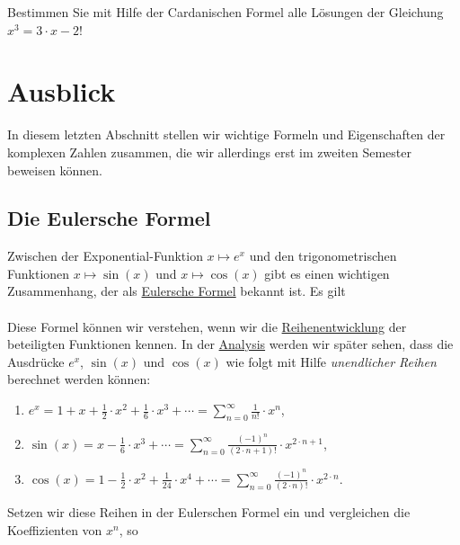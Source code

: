 \exercise
Bestimmen Sie mit Hilfe der Cardanischen Formel alle L\"{o}sungen der Gleichung 
\\[0.2cm]
\hspace*{1.3cm}
$x^3 = 3 \cdot x - 2$!
\exend


\section{Ausblick}
In diesem letzten Abschnitt stellen wir wichtige Formeln und Eigenschaften der komplexen Zahlen
zusammen, die wir allerdings erst im zweiten Semester beweisen k\"{o}nnen.

\subsection{Die Eulersche Formel}
Zwischen der Exponential-Funktion $x \mapsto e^x$ und den trigonometrischen Funktionen 
$x \mapsto \sin(x)$ und $x \mapsto \cos(x)$ gibt es einen wichtigen Zusammenhang, der als
{\href{https://de.wikipedia.org/wiki/Eulersche_Formel}{Eulersche Formel}} bekannt ist.  Es gilt
\\[0.2cm]
\hspace*{1.3cm}
\colorbox{red}{}
\\[0.2cm]
Diese Formel k\"{o}nnen wir verstehen, wenn wir die
\href{https://de.wikipedia.org/wiki/Taylorreihe}{Reihenentwicklung} der beteiligten Funktionen
kennen.  In der
\href{https://github.com/karlstroetmann/Analysis/blob/master/Script/analysis.pdf}{Analysis} werden
wir sp\"{a}ter sehen, dass die Ausdr\"ucke $e^x$, $\sin(x)$ und $\cos(x)$ wie folgt 
mit Hilfe \emph{\color{blue}unendlicher Reihen} berechnet werden k\"{o}nnen:
\begin{enumerate}
\item $\displaystyle e^x = 1 + x + \frac{1}{2} \cdot x^2 + \frac{1}{6} \cdot x^3 + \cdots = \sum\limits_{n=0}^\infty \frac{1}{n!} \cdot x^n$,
\item $\displaystyle \sin(x) = x - \frac{1}{6} \cdot x^3 + \cdots = \sum\limits_{n=0}^\infty \frac{(-1)^{n}}{(2 \cdot n + 1)!} \cdot x^{2 \cdot n + 1}$,
\item $\displaystyle \cos(x) = 1 -  \frac{1}{2} \cdot x^2 +  \frac{1}{24} \cdot x^4 + \cdots = \sum\limits_{n=0}^\infty  \frac{(-1)^{n}}{(2 \cdot n)!} \cdot x^{2 \cdot n}$.
\end{enumerate}
Setzen wir diese Reihen in der Eulerschen Formel ein und vergleichen die Koeffizienten von $x^n$, so
